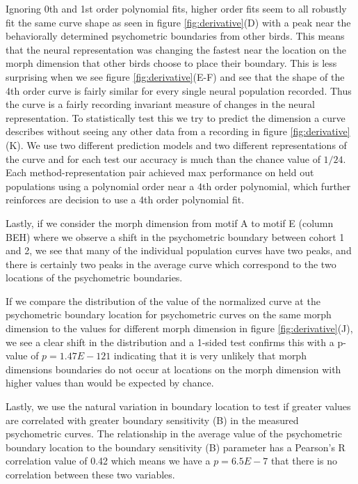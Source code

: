 Ignoring 0th and 1st order polynomial fits, higher order fits seem to all robustly fit the same curve shape as seen in figure \ref{fig:derivative}(D) with a peak near the behaviorally determined psychometric boundaries from other birds. This means that the neural representation was changing the fastest near the location on the morph dimension that other birds choose to place their boundary. This is less surprising when we see figure \ref{fig:derivative}(E-F) and see that the shape of the 4th order \Thielk curve is fairly similar for every single neural population recorded. Thus the \Thielk curve is a fairly recording invariant measure of changes in the neural representation. To statistically test this we try to predict the dimension a \Thielk curve describes without seeing any other data from a recording in figure \ref{fig:derivative}(K). We use two different prediction models and two different representations of the \Thielk curve and for each test our accuracy is much than the chance value of $1/24$. Each method-representation pair achieved max performance on held out populations using a polynomial order near a 4th order polynomial, which further reinforces are decision to use a 4th order polynomial fit. 

Lastly, if we consider the morph dimension from motif A to motif E (column BEH) where we observe a shift in the psychometric boundary between cohort 1 and 2, we see that many of the individual population \Thielk curves have two peaks, and there is certainly two peaks in the average \Thielk curve which correspond to the two locations of the psychometric boundaries.

If we compare the distribution of the value of the normalized \Thielk curve at the psychometric boundary location for psychometric curves on the same morph dimension to the values for different morph dimension in figure \ref{fig:derivative}(J), we see a clear shift in the distribution and a 1-sided \KS test confirms this with a p-value of $p=1.47E-121$ indicating that it is very unlikely that morph dimensions boundaries do not occur at locations on the morph dimension with higher \Thielk values than would be expected by chance.

Lastly, we use the natural variation in boundary location to test if greater \Thielk values are correlated with greater boundary sensitivity (B) in the measured psychometric curves. The relationship in the average \Thielk value of the psychometric boundary location to the boundary sensitivity (B) parameter has a Pearson's R correlation value of 0.42 which means we have a $p=6.5E-7$ that there is no correlation between these two variables.

